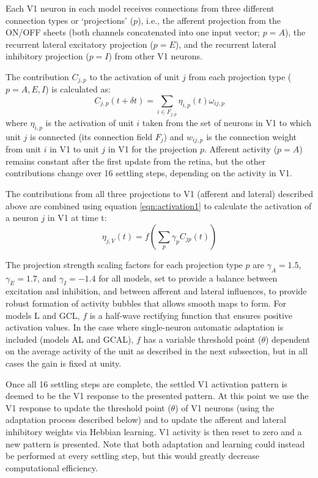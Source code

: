 \documentclass{article}
\begin{document}
Each V1 neuron in each model receives connections from three different
connection types or `projections' ($p$), i.e., the afferent projection
from the ON/OFF sheets (both channels concatenated into one input
vector; $p=A$), the recurrent lateral excitatory projection ($p=E$),
and the recurrent lateral inhibitory projection ($p=I$) from other V1
neurons.

The contribution $C_{j,p}$ to the activation of unit $j$ from each
projection type ($p=A,E,I$) is calculated as:
\begin{equation}
C_{j,p}(t+\delta t)=\sum_{i\in F_{j,p}}\eta_{i, p}(t)\omega_{ij,p}
\label{eqn:update}
\end{equation}
where $\eta_{i, p}$ is the activation of unit $i$ taken from the set
of neurons in V1 to which unit $j$ is connected (its connection field
$F_j$) and $w_{ij,p}$ is the connection weight from unit $i$ in V1 to
unit $j$ in V1 for the projection $p$. Afferent activity ($p=A$)
remains constant after the first update from the retina, but the other
contributions change over 16 settling steps, depending on the activity
in V1.

The contributions from all three projections to V1 (afferent and
lateral) described above are combined using equation
\ref{eqn:activation1} to calculate the activation of a
neuron $j$ in V1 at time t:
\begin{equation}
\eta_{j,V}(t)=f\left(\sum_{p}\gamma_{p}C_{jp}(t)\right)
\label{eqn:activation1}
\end{equation}

The projection strength scaling factors for each projection type $p$
are $\gamma_{A}=1.5$, $\gamma_{E}=1.7$, and $\gamma_{I}=-1.4$ for all
models, set to provide a balance between excitation and inhibition,
and between afferent and lateral influences, to provide robust
formation of activity bubbles that allows smooth maps to form. For
models L and GCL, $f$ is a
half-wave rectifying function that ensures positive activation
values. In the case where single-neuron automatic adaptation is
included (models AL and GCAL), $f$ has a variable threshold point
($\theta$) dependent on the average activity of the unit as described
in the next subsection, but in all cases the gain is fixed at unity.

Once all 16 settling steps are complete, the settled V1 activation
pattern is deemed to be the V1 response to the presented pattern. At
this point we use the V1 response to update the threshold point
($\theta$) of V1 neurons (using the adaptation process described
below) and to update the afferent and lateral inhibitory weights via
Hebbian learning. V1 activity is then reset to zero and a new pattern
is presented. Note that both adaptation and learning could instead be
performed at every settling step, but this would greatly decrease
computational efficiency.
\end{document}
